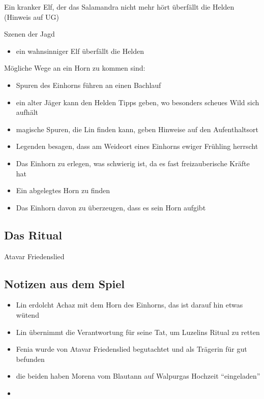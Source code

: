 Ein kranker Elf, der das Salamandra nicht mehr hört überfällt die Helden (Hinweis auf UG)

Szenen der Jagd

\begin{itemize}
	\item ein wahnsinniger Elf überfällt die Helden
\end{itemize}

Mögliche Wege an ein Horn zu kommen sind:
\begin{itemize}
	\item Spuren des Einhorns führen an einen Bachlauf
	\item ein alter Jäger kann den Helden Tipps geben, wo besonders scheues Wild sich aufhält
	\item magische Spuren, die Lin finden kann, geben Hinweise auf den Aufenthaltsort
	\item Legenden besagen, dass am Weideort eines Einhorns ewiger Frühling herrscht
	\item Das Einhorn zu erlegen, was schwierig ist, da es fast freizauberische Kräfte hat
	\item Ein abgelegtes Horn zu finden
	\item Das Einhorn davon zu überzeugen, dass es sein Horn aufgibt
\end{itemize}

\subsection{Das Ritual}
Atavar Friedenslied

\subsection{Notizen aus dem Spiel}
\begin{itemize}
	\item Lin erdolcht Achaz mit dem Horn des Einhorns, das ist darauf hin etwas wütend
	\item Lin übernimmt die Verantwortung für seine Tat, um Luzelins Ritual zu retten
	\item Fenia wurde von Atavar Friedenslied begutachtet und als Trägerin für gut befunden
	\item die beiden haben Morena vom Blautann auf Walpurgas Hochzeit ``eingeladen''
	\item 
\end{itemize}


